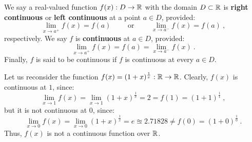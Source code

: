 \begin{definition}
We say a real-valued function $f(x):D \to \mathbb{R}$ with the domain $D \subset \mathbb{R}$ is {\bf right continuous} or {\bf left continuous} at a point $a \in D$, provided:
\[
\lim_{x \to a^+} f(x) = f(a) \qquad \text{ or } \qquad 
\lim_{x \to a^-} f(x) = f(a) \ ,
\]
respectively.  We say $f$ is {\bf continuous} at $a \in D$, provided:
\[
\lim_{x \to a^+} f(x) = f(a) =
\lim_{x \to a^-} f(x) \ .
\]
Finally, $f$ is said to be continuous if $f$ is continuous at every $a \in D$.
\end{definition}
\begin{example}[Discontinuity of $f(x)=(1+x)^{\frac{1}{x}}$ at $0$]
Let us reconsider the function $f(x)=(1+x)^{\frac{1}{x}}:\mathbb{R} \to \mathbb{R}$.  Clearly, $f(x)$ is continuous at $1$, since:
\[
\lim_{x \to 1} f(x) = \lim_{x \to 1}(1+x)^{\frac{1}{x}} = 2 = f(1)=(1+1)^{\frac{1}{1}} \ ,
\]
but it is not continuous at $0$, since:
\[
\lim_{x \to 0} f(x) = \lim_{x \to 0} (1+x)^{\frac{1}{x}} = e \approxeq 2.71828 \neq f(0) = (1+0)^{\frac{1}{0}} \ .
\]
Thus, $f(x)$ is not a continuous function over $\mathbb{R}$.
\end{example}



